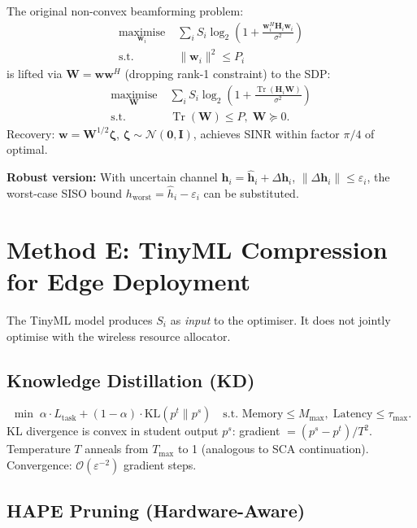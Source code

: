 \documentclass[conference]{IEEEtran}
\begin{document}
The original non-convex beamforming problem:
\begin{align}
\underset{\mathbf{w}_i}{\text{maximise}}\;&
\sum_i S_i \log_2\!\left(1 + \frac{\mathbf{w}_i^H \mathbf{H}_i \mathbf{w}_i}{\sigma^2}\right)\nonumber\\
\text{s.t.}\;&\|\mathbf{w}_i\|^2 \le P_i
\end{align}
is lifted via $\mathbf{W} = \mathbf{w}\mathbf{w}^H$ (dropping rank-1 constraint) to the SDP:
\begin{align}
\underset{\mathbf{W}}{\text{maximise}}\;&
\sum_i S_i \log_2\!\left(1 + \frac{\operatorname{Tr}(\mathbf{H}_i\mathbf{W})}{\sigma^2}\right)\nonumber\\
\text{s.t.}\;&\operatorname{Tr}(\mathbf{W}) \le P,\;\mathbf{W} \succeq 0.
\end{align}
Recovery: $\mathbf{w} = \mathbf{W}^{1/2}\boldsymbol{\zeta}$, $\boldsymbol{\zeta}\sim\mathcal{N}(\mathbf{0},\mathbf{I})$, achieves SINR within factor $\pi/4$ of optimal.

\textbf{Robust version:} With uncertain channel $\mathbf{h}_i = \hat{\mathbf{h}}_i + \Delta\mathbf{h}_i$, $\|\Delta\mathbf{h}_i\|\le\varepsilon_i$, the worst-case SISO bound $h_{\text{worst}} = \hat{h}_i - \varepsilon_i$ can be substituted.

\section{Method E: TinyML Compression for Edge Deployment}
\label{sec:tinyml}

The TinyML model produces $S_i$ as \emph{input} to the optimiser. It does not jointly optimise with the wireless resource allocator.

\subsection{Knowledge Distillation (KD)}

\begin{equation}
\min\;\alpha\cdot L_{\text{task}} + (1-\alpha)\cdot
\mathrm{KL}(p^t \| p^s)
\quad\text{s.t. Memory}\le M_{\max},\;\text{Latency}\le\tau_{\max}.
\end{equation}
KL divergence is convex in student output $p^s$: gradient $= (p^s - p^t)/T^2$.
Temperature $T$ anneals from $T_{\max}$ to 1 (analogous to SCA continuation).
Convergence: $\mathcal{O}(\varepsilon^{-2})$ gradient steps.

\subsection{HAPE Pruning (Hardware-Aware)}
\end{document}
